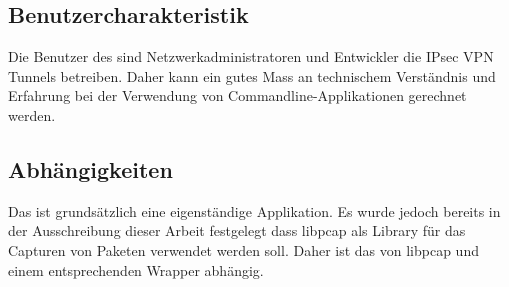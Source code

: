 \subsection{Benutzercharakteristik}
Die Benutzer des \tool{} sind Netzwerkadministratoren und Entwickler die \acs{IPsec} \acs{VPN} Tunnels betreiben. Daher kann ein gutes Mass an technischem Verständnis und Erfahrung bei der Verwendung von Commandline-Applikationen gerechnet werden.

\subsection{Abhängigkeiten}
Das \tool{} ist grundsätzlich eine eigenständige Applikation. Es wurde jedoch bereits in der Ausschreibung dieser Arbeit festgelegt dass libpcap als Library für das Capturen von Paketen verwendet werden soll. Daher ist das \tool{} von libpcap und einem entsprechenden Wrapper abhängig.
